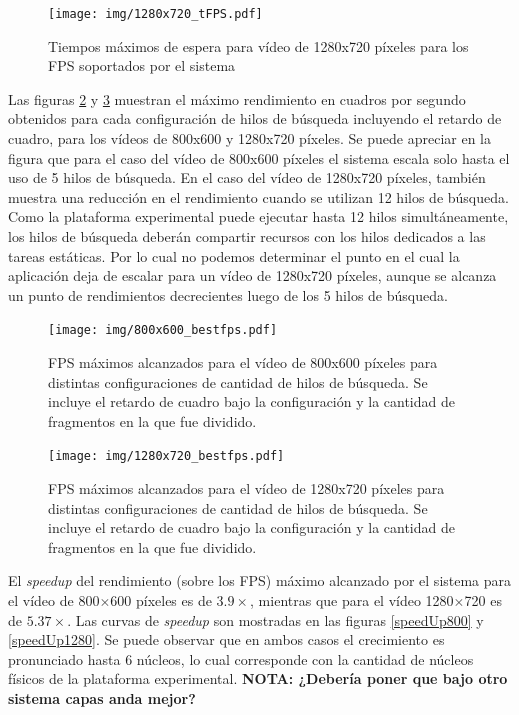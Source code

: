 \begin{figure}[!h]

	\texttt{[image: img/1280x720\_tFPS.pdf]}
	\caption{Tiempos máximos de espera para vídeo de 1280x720 píxeles para
	los FPS soportados por el sistema}
	\label{1280tFPS}

\end{figure}

Las figuras \ref{bestFPS800} y \ref{bestFPS1280} muestran el máximo rendimiento
en cuadros por segundo obtenidos para cada configuración de hilos de búsqueda
incluyendo el retardo de cuadro, para los vídeos de 800x600 y 1280x720 píxeles.
Se puede apreciar en la figura que para el caso del vídeo de 800x600 píxeles el
sistema escala solo hasta el uso de 5 hilos de búsqueda. En el caso del vídeo de
1280x720 píxeles, también muestra una reducción en el rendimiento cuando se
utilizan 12 hilos de búsqueda. Como la plataforma experimental puede ejecutar
hasta 12 hilos simultáneamente, los hilos de búsqueda deberán compartir recursos
con los hilos dedicados a las tareas estáticas. Por lo cual no podemos
determinar el punto en el cual la aplicación deja de escalar para un vídeo de
1280x720 píxeles, aunque se alcanza un punto de rendimientos decrecientes luego
de los 5 hilos de búsqueda.

\begin{figure}[!h]

	\texttt{[image: img/800x600\_bestfps.pdf]}
	\caption{FPS máximos alcanzados para el vídeo de 800x600 píxeles para
	distintas configuraciones de cantidad de hilos de búsqueda. Se incluye
	el retardo de cuadro bajo la configuración y la cantidad de fragmentos
	en la que fue dividido.} \label{bestFPS800}

\end{figure}

\begin{figure}[!h]

	\texttt{[image: img/1280x720\_bestfps.pdf]}
	\caption{FPS máximos alcanzados para el vídeo de 1280x720 píxeles para
	distintas configuraciones de cantidad de hilos de búsqueda. Se incluye
	el retardo de cuadro bajo la configuración y la cantidad de fragmentos
	en la que fue dividido.}
	\label{bestFPS1280}

\end{figure}

El \emph{speedup} del rendimiento (sobre los FPS) máximo alcanzado por el
sistema para el vídeo de 800$\times$600 píxeles es de $3.9\times$, mientras que
para el vídeo 1280$\times$720 es de $5.37\times$. Las curvas de \emph{speedup}
son mostradas en las figuras \ref{speedUp800} y \ref{speedUp1280}. Se puede
observar que en ambos casos el crecimiento es pronunciado hasta 6 núcleos, lo
cual corresponde con la cantidad de núcleos físicos de la plataforma
experimental. {\bf NOTA: ¿Debería poner que bajo otro sistema capas anda
mejor?}


